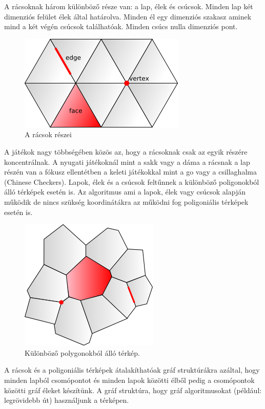 
A rácsoknak három különböző része van: a lap, élek és csúcsok. Minden lap két dimenziós felület élek által határolva. Minden él egy dimenziós szakasz aminek mind a két végén csúcsok találhatóak. Minden csúcs nulla dimenziós pont. 

\begin{figure}[h]
\centering
\includegraphics[scale=0.5]{kepek/img31.png}
\caption{A rácsok részei}
\label{fig:img31}
\end{figure}

\noindent A játékok nagy többségében közös az, hogy a rácsoknak csak az egyik részére koncentrálnak. A nyugati játékoknál mint a sakk vagy a dáma a rácsnak a lap részén van a fókusz ellentétben a keleti játékokkal mint a go vagy a csillaghalma (Chinese Checkers).
\newline
\newline Lapok, élek és a csúcsok feltűnnek a különböző poligonokból álló  térképek esetén is. Az algoritmus ami a lapok, élek vagy csúcsok alapján működik de nincs szükség koordinátákra az működni fog poligoniális térképek esetén is.

\begin{figure}[h]
\centering
\includegraphics[scale=0.5]{kepek/img32.png}
\caption{Különböző polygonokból álló térkép.}
\label{fig:img32}
\end{figure}

\noindent A rácsok és a poligoniális térképek átalakíthatóak gráf struktúrákra azáltal, hogy minden lapból csomópontot és minden lapok közötti élből pedig a csomópontok közötti gráf éleket készítünk. A gráf struktúra, hogy gráf algoritmusokat (például: legrövidebb út) használjunk a térképen.

